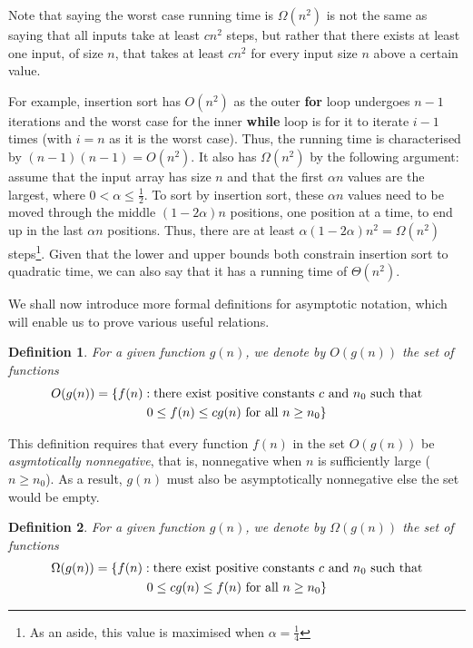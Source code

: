 \documentclass[12pt]{article}
\newtheorem{definition}{Definition}
\begin{document}
Note that saying the worst case running time is $\Omega(n^2)$ is not the same as saying that all inputs take
at least $cn^2$ steps, but rather that there exists at least one input, of size $n$, that takes at least $cn^2$
for every input size $n$ above a certain value.

For example, insertion sort has $O(n^2)$ as the outer \textbf{for} loop undergoes $n - 1$ iterations and the worst
case for the inner \textbf{while} loop is for it to iterate $i - 1$ times (with $i = n$ as it is the worst case). Thus, the
running time is characterised by $(n - 1)(n - 1) = O(n^2)$. It also has $\Omega(n^2)$ by the following argument: assume that
the input array has size $n$ and that the first $\alpha n$ values are the largest, where $0 < \alpha \leq \frac{1}{2}$. To sort
by insertion sort, these $\alpha n$ values need to be moved through the middle $(1 - 2\alpha)n$ positions, one position at a time,
to end up in the last $\alpha n$ positions. Thus, there are at least $\alpha(1 - 2\alpha)n^2 = \Omega(n^2)$ steps\footnote{As an aside,
this value is maximised when $\alpha = \frac{1}{4}$}. Given that the lower and upper bounds both constrain insertion sort to
quadratic time, we can also say that it has a running time of $\Theta(n^2)$.

We shall now introduce more formal definitions for asymptotic notation, which will enable us to prove various
useful relations.
\begin{definition}
    For a given function $g(n)$, we denote by $O(g(n))$ the set of functions
    \begin{multline*}
        O(g(n)) = \{f(n): \textnormal{there exist positive constants } c \textnormal{ and } n_0 \textnormal{ such that}\\
        0 \leq f(n) \leq cg(n) \textnormal{ for all } n \geq n_0\}
    \end{multline*}
\end{definition}
This definition requires that every function $f(n)$ in the set $O(g(n))$ be \textit{asymtotically nonnegative},
that is, nonnegative when $n$ is sufficiently large ($n \geq n_0$). As a result, $g(n)$ must also be asymptotically
nonnegative else the set would be empty.

\begin{definition}
    For a given function $g(n)$, we denote by $\Omega(g(n))$ the set of functions
    \begin{multline*}
        \Omega(g(n)) = \{f(n): \textnormal{there exist positive constants } c \textnormal{ and } n_0 \textnormal{ such that}\\
        0 \leq cg(n) \leq f(n) \textnormal{ for all } n \geq n_0\}
    \end{multline*}
\end{definition}
\end{document}
